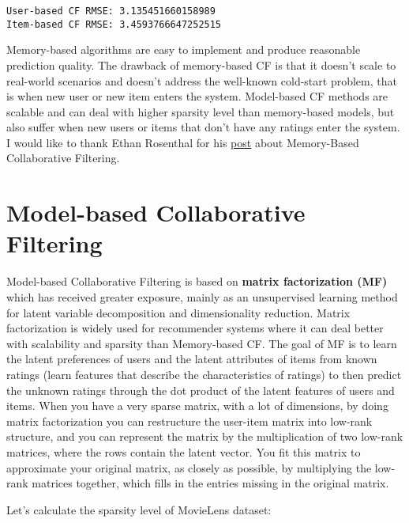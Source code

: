 \documentclass[11pt]{article}
\begin{document}
    \begin{Verbatim}[commandchars=\\\{\}]
User-based CF RMSE: 3.135451660158989
Item-based CF RMSE: 3.4593766647252515

    \end{Verbatim}

    Memory-based algorithms are easy to implement and produce reasonable
prediction quality. The drawback of memory-based CF is that it doesn't
scale to real-world scenarios and doesn't address the well-known
cold-start problem, that is when new user or new item enters the system.
Model-based CF methods are scalable and can deal with higher sparsity
level than memory-based models, but also suffer when new users or items
that don't have any ratings enter the system. I would like to thank
Ethan Rosenthal for his
\href{http://blog.ethanrosenthal.com/2015/11/02/intro-to-collaborative-filtering/}{post}
about Memory-Based Collaborative Filtering.

    \hypertarget{model-based-collaborative-filtering}{%
\section{Model-based Collaborative
Filtering}\label{model-based-collaborative-filtering}}

Model-based Collaborative Filtering is based on \textbf{matrix
factorization (MF)} which has received greater exposure, mainly as an
unsupervised learning method for latent variable decomposition and
dimensionality reduction. Matrix factorization is widely used for
recommender systems where it can deal better with scalability and
sparsity than Memory-based CF. The goal of MF is to learn the latent
preferences of users and the latent attributes of items from known
ratings (learn features that describe the characteristics of ratings) to
then predict the unknown ratings through the dot product of the latent
features of users and items. When you have a very sparse matrix, with a
lot of dimensions, by doing matrix factorization you can restructure the
user-item matrix into low-rank structure, and you can represent the
matrix by the multiplication of two low-rank matrices, where the rows
contain the latent vector. You fit this matrix to approximate your
original matrix, as closely as possible, by multiplying the low-rank
matrices together, which fills in the entries missing in the original
matrix.

Let's calculate the sparsity level of MovieLens dataset:
\end{document}
